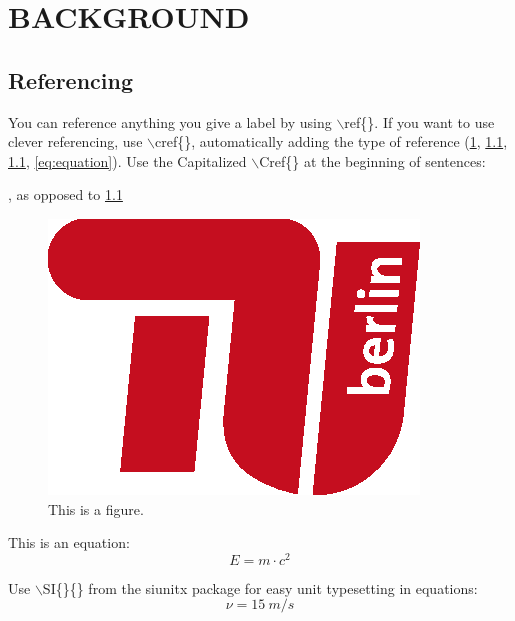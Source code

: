 \chapter{BACKGROUND}
\label{ch:background}

\section{Referencing}
\label{ch:referencing}
You can reference anything you give a label by using $\backslash$ref\{\}. If you want to use clever referencing, use $\backslash$cref\{\}, automatically adding the type of reference (\cref{ch:background}, \cref{ch:referencing}, \cref{fig:TU_logo}, \cref{eq:equation}). Use the Capitalized $\backslash$Cref\{\} at the beginning of sentences:

, as opposed to \cref{fig:TU_logo}

\begin{figure}[htb] %
	\centering
	\includegraphics[width=.3\linewidth]{Graphics/TU_Logo_kurz_RGB_rot}
	\caption{This is a figure.}
	\label{fig:TU_logo}
\end{figure}

This is an equation:
\begin{equation}\label{eq:equation}
	E = m \cdot c^2
\end{equation}

Use $\backslash$SI\{\}\{\} from the siunitx package for easy unit typesetting in equations:
\begin{equation}\label{eq:equation}
	\nu = \SI{15}{m/s}
\end{equation}

\clearpage %


